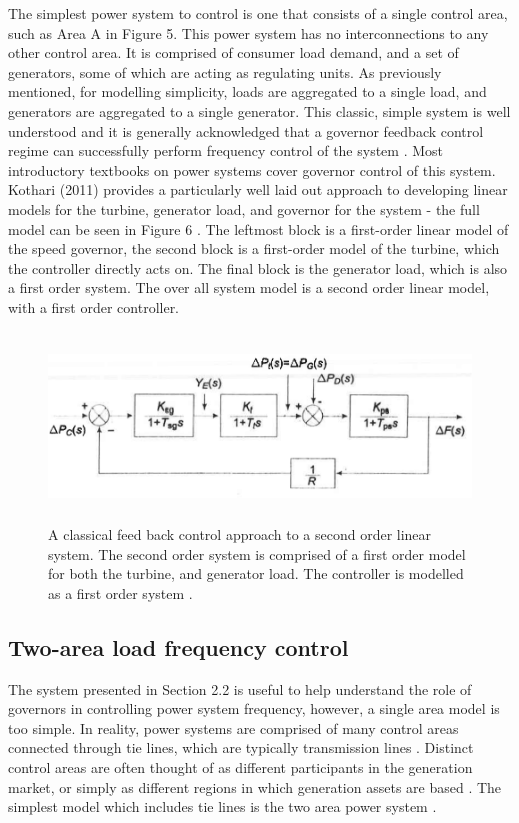 \documentclass[12pt, a4paper]{article}
\begin{document}
The simplest power system to control is one that consists of a single control area, such as Area A in Figure 5. This power system has no interconnections to any other control area. It is comprised of consumer load demand, and a set of generators, some of which are acting as regulating units. As previously mentioned, for modelling simplicity, loads are aggregated to a single load, and generators are aggregated to a single generator. This classic, simple system is well understood and it is generally acknowledged that a governor feedback control regime can successfully perform frequency control of the system \cite{Wood2013, Grainger1994, Kothari2011}. Most introductory textbooks on power systems cover governor control of this system. Kothari (2011) provides a particularly well laid out approach to developing linear models for the turbine, generator load, and governor for the system - the full model can be seen in Figure 6 \cite{Kothari2011}. The leftmost block is a first-order linear model of the speed governor, the second block is a first-order model of the turbine, which the controller directly acts on. The final block is the generator load, which is also a first order system. The over all system model is a second order linear model, with a first order controller.

\begin{figure}[h]
\centering
\includegraphics[height=5cm]{single_area_control}
\caption{A classical feed back control approach to a second order linear system. The second order system is comprised of a first order model for both the turbine, and generator load. The controller is modelled as a first order system \cite{Kothari2011}.}
\end{figure}


\subsection{Two-area load frequency control}
The system presented in Section 2.2 is useful to help understand the role of governors in controlling power system frequency, however, a single area model is too simple. In reality, power systems are comprised of many control areas connected through tie lines, which are typically transmission lines \cite{NPTEL202002}. Distinct control areas are often thought of as different participants in the generation market, or simply as different regions in which generation assets are based \cite{NPTEL202002}. The simplest model which includes tie lines is the two area power system \cite{Kothari2011}. 
\end{document}
